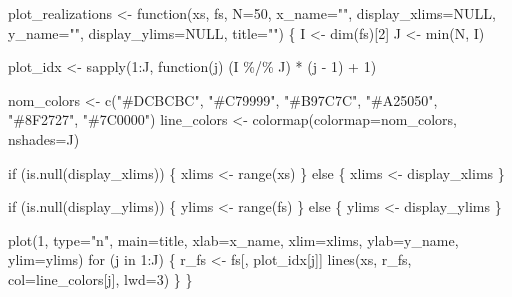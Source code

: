 \documentclass[
  letterpaper,
  DIV=11,
  numbers=noendperiod]{scrartcl}
\newenvironment{Shaded}{\begin{snugshade}}{\end{snugshade}}
\newcommand{\AttributeTok}[1]{\textcolor[rgb]{0.40,0.45,0.13}{#1}}
\newcommand{\ConstantTok}[1]{\textcolor[rgb]{0.56,0.35,0.01}{#1}}
\newcommand{\ControlFlowTok}[1]{\textcolor[rgb]{0.00,0.23,0.31}{#1}}
\newcommand{\DecValTok}[1]{\textcolor[rgb]{0.68,0.00,0.00}{#1}}
\newcommand{\FunctionTok}[1]{\textcolor[rgb]{0.28,0.35,0.67}{#1}}
\newcommand{\NormalTok}[1]{\textcolor[rgb]{0.00,0.23,0.31}{#1}}
\newcommand{\OtherTok}[1]{\textcolor[rgb]{0.00,0.23,0.31}{#1}}
\newcommand{\SpecialCharTok}[1]{\textcolor[rgb]{0.37,0.37,0.37}{#1}}
\newcommand{\StringTok}[1]{\textcolor[rgb]{0.13,0.47,0.30}{#1}}
\begin{document}
\begin{Shaded}
\begin{Highlighting}[]
\NormalTok{plot\_realizations }\OtherTok{\textless{}{-}} \ControlFlowTok{function}\NormalTok{(xs, fs, }\AttributeTok{N=}\DecValTok{50}\NormalTok{,}
                              \AttributeTok{x\_name=}\StringTok{""}\NormalTok{, }\AttributeTok{display\_xlims=}\ConstantTok{NULL}\NormalTok{,}
                              \AttributeTok{y\_name=}\StringTok{""}\NormalTok{, }\AttributeTok{display\_ylims=}\ConstantTok{NULL}\NormalTok{,}
                              \AttributeTok{title=}\StringTok{""}\NormalTok{) \{}
\NormalTok{  I }\OtherTok{\textless{}{-}} \FunctionTok{dim}\NormalTok{(fs)[}\DecValTok{2}\NormalTok{]}
\NormalTok{  J }\OtherTok{\textless{}{-}} \FunctionTok{min}\NormalTok{(N, I)}

\NormalTok{  plot\_idx }\OtherTok{\textless{}{-}} \FunctionTok{sapply}\NormalTok{(}\DecValTok{1}\SpecialCharTok{:}\NormalTok{J, }\ControlFlowTok{function}\NormalTok{(j) (I }\SpecialCharTok{\%/\%}\NormalTok{ J) }\SpecialCharTok{*}\NormalTok{ (j }\SpecialCharTok{{-}} \DecValTok{1}\NormalTok{) }\SpecialCharTok{+} \DecValTok{1}\NormalTok{)}

\NormalTok{  nom\_colors }\OtherTok{\textless{}{-}} \FunctionTok{c}\NormalTok{(}\StringTok{"\#DCBCBC"}\NormalTok{, }\StringTok{"\#C79999"}\NormalTok{, }\StringTok{"\#B97C7C"}\NormalTok{,}
                  \StringTok{"\#A25050"}\NormalTok{, }\StringTok{"\#8F2727"}\NormalTok{, }\StringTok{"\#7C0000"}\NormalTok{)}
\NormalTok{  line\_colors }\OtherTok{\textless{}{-}} \FunctionTok{colormap}\NormalTok{(}\AttributeTok{colormap=}\NormalTok{nom\_colors, }\AttributeTok{nshades=}\NormalTok{J)}

  \ControlFlowTok{if}\NormalTok{ (}\FunctionTok{is.null}\NormalTok{(display\_xlims)) \{}
\NormalTok{    xlims }\OtherTok{\textless{}{-}} \FunctionTok{range}\NormalTok{(xs)}
\NormalTok{  \} }\ControlFlowTok{else}\NormalTok{ \{}
\NormalTok{    xlims }\OtherTok{\textless{}{-}}\NormalTok{ display\_xlims}
\NormalTok{  \}}

  \ControlFlowTok{if}\NormalTok{ (}\FunctionTok{is.null}\NormalTok{(display\_ylims)) \{}
\NormalTok{    ylims }\OtherTok{\textless{}{-}} \FunctionTok{range}\NormalTok{(fs)}
\NormalTok{  \} }\ControlFlowTok{else}\NormalTok{ \{}
\NormalTok{    ylims }\OtherTok{\textless{}{-}}\NormalTok{ display\_ylims}
\NormalTok{  \}}

  \FunctionTok{plot}\NormalTok{(}\DecValTok{1}\NormalTok{, }\AttributeTok{type=}\StringTok{"n"}\NormalTok{, }\AttributeTok{main=}\NormalTok{title,}
       \AttributeTok{xlab=}\NormalTok{x\_name, }\AttributeTok{xlim=}\NormalTok{xlims,}
       \AttributeTok{ylab=}\NormalTok{y\_name, }\AttributeTok{ylim=}\NormalTok{ylims)}
  \ControlFlowTok{for}\NormalTok{ (j }\ControlFlowTok{in} \DecValTok{1}\SpecialCharTok{:}\NormalTok{J) \{}
\NormalTok{    r\_fs }\OtherTok{\textless{}{-}}\NormalTok{ fs[, plot\_idx[j]]}
    \FunctionTok{lines}\NormalTok{(xs, r\_fs, }\AttributeTok{col=}\NormalTok{line\_colors[j], }\AttributeTok{lwd=}\DecValTok{3}\NormalTok{)}
\NormalTok{  \}}
\NormalTok{\}}


\end{Highlighting}
\end{Shaded}
\end{document}
